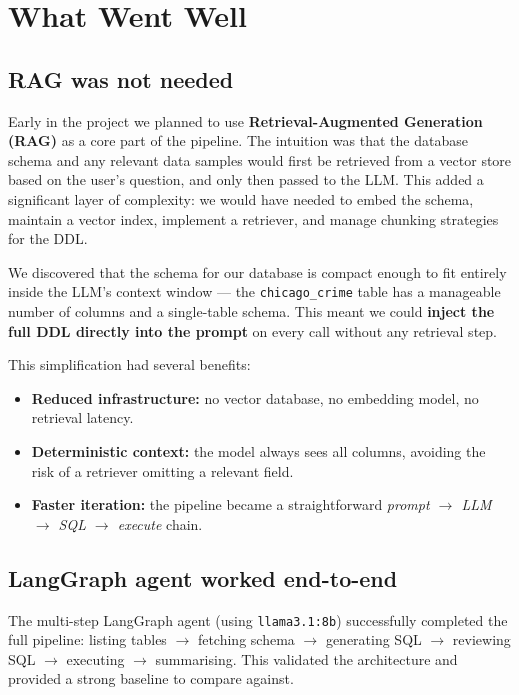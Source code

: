 \documentclass[12pt,a4paper]{article}
\begin{document}
\section{What Went Well}

\subsection{RAG was not needed}

Early in the project we planned to use \textbf{Retrieval-Augmented Generation (RAG)}
as a core part of the pipeline.  The intuition was that the database schema and any
relevant data samples would first be retrieved from a vector store based on the
user's question, and only then passed to the LLM.  This added a significant layer of
complexity: we would have needed to embed the schema, maintain a vector index,
implement a retriever, and manage chunking strategies for the DDL.

We discovered that the schema for our database is compact enough to fit entirely
inside the LLM's context window --- the \texttt{chicago\_crime} table has a
manageable number of columns and a single-table schema. This meant we could
\textbf{inject the full DDL directly into the prompt} on every call without any
retrieval step.

This simplification had several benefits:
\begin{itemize}[leftmargin=*, itemsep=2pt]
    \item \textbf{Reduced infrastructure:} no vector database, no embedding model,
          no retrieval latency.
    \item \textbf{Deterministic context:} the model always sees all columns, avoiding
          the risk of a retriever omitting a relevant field.
    \item \textbf{Faster iteration:} the pipeline became a straightforward
          \emph{prompt $\rightarrow$ LLM $\rightarrow$ SQL $\rightarrow$ execute}
          chain.
\end{itemize}

\subsection{LangGraph agent worked end-to-end}

The multi-step LangGraph agent (using \texttt{llama3.1:8b}) successfully completed
the full pipeline: listing tables $\to$ fetching schema $\to$ generating SQL $\to$
reviewing SQL $\to$ executing $\to$ summarising.  This validated the architecture
and provided a strong baseline to compare against.
\end{document}
